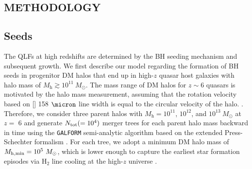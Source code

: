 \documentclass[twocolumn, twocolappendix]{aastex63}
\newcommand{\Msun}{M_\odot}
\newcommand{\Mh}{M_\mathrm{h}}
\begin{document}
\begin{CJK*}{UTF8}{gbsn}
\vspace{2mm}
\section{METHODOLOGY}\label{sec:method}

\vspace{2mm}
\subsection{Seeds}\label{sec:seed}
The QLFs at high redshifts are determined by the BH seeding mechanism and subsequent growth. 
We first describe our model regarding the formation of BH seeds in progenitor DM halos 
that end up in high-$z$ quasar host galaxies with halo mass of $\Mh \gtrsim 10^{11}~\Msun$.
The mass range of DM halos for $z\sim 6$ quasars is motivated by the halo mass measurement, 
assuming that the rotation velocity based on [] 158 $\micron$ line width is equal to the circular velocity of the halo.
\citep{2002ApJ...578...90F,2013ApJ...773...44W,2019ApJ...872L..29S}.
Therefore, we consider three parent halos with $\Mh = 10^{11}$, $10^{12}$, and $10^{13} ~\Msun$ at $z=$ 6
and generate $N_{\rm tot} (= 10^4)$ merger trees for each parent halo mass backward in time using the {\tt GALFORM} 
semi-analytic algorithm based on the extended Press-Schechter formalism 
\citep{1974ApJ...187..425P,2000MNRAS.319..168C,2008MNRAS.383..557P}.
For each tree, we adopt a minimum DM halo mass of $M_{\rm h,min}=10^5~\Msun$, which is lower enough to capture 
the earliest star formation episodes via H$_2$ line cooling at the high-$z$ universe \citep{1996ApJ...464..523H,1997ApJ...474....1T}.



\end{CJK*}
\end{document}
